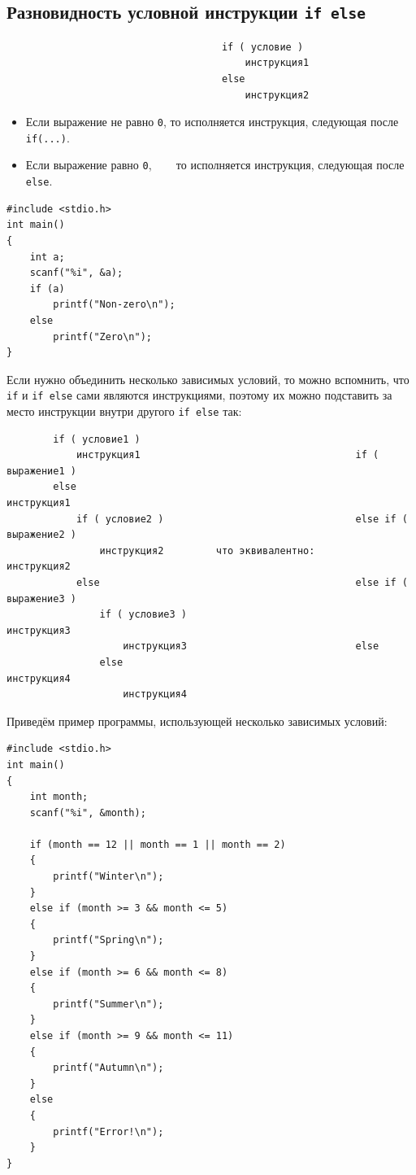 \documentclass[10pt]{article}
\begin{document}
\subsection*{Разновидность условной инструкции \texttt{if else}}
\begin{lstlisting}
                                     if ( условие )
                                         инструкция1
                                     else 
                                         инструкция2
\end{lstlisting}
\begin{itemize}
\item Если выражение не равно \texttt{0}, то исполняется инструкция, следующая после \texttt{if(...)}.
\item Если выражение равно \texttt{0}, ~~~ то исполняется инструкция, следующая после \texttt{else}.
\end{itemize}
\begin{lstlisting}
#include <stdio.h>
int main()
{
    int a;
    scanf("%i", &a);
    if (a)
        printf("Non-zero\n");
    else
        printf("Zero\n");
}
\end{lstlisting}
Если нужно объединить несколько зависимых условий, то можно вспомнить, что \texttt{if} и \texttt{if else} сами являются инструкциями, поэтому их можно подставить за место инструкции внутри другого \texttt{if else} так:
\begin{lstlisting}
        if ( условие1 )                                                                             
            инструкция1                                     if ( выражение1 )
        else                                                    инструкция1
            if ( условие2 )                                 else if ( выражение2 )
                инструкция2         что эквивалентно:           инструкция2
            else                                            else if ( выражение3 )            
                if ( условие3 )                                 инструкция3
                    инструкция3                             else
                else                                            инструкция4
                    инструкция4                                                                                                                        
\end{lstlisting}

Приведём пример программы, использующей несколько зависимых условий:
\begin{lstlisting}
#include <stdio.h>
int main() 
{
    int month;
    scanf("%i", &month);
    
    if (month == 12 || month == 1 || month == 2)
    {
        printf("Winter\n");
    }
    else if (month >= 3 && month <= 5) 
    {
        printf("Spring\n");
    }
    else if (month >= 6 && month <= 8) 
    {
        printf("Summer\n");
    }
    else if (month >= 9 && month <= 11) 
    {
        printf("Autumn\n");
    }
    else 
    {
        printf("Error!\n");
    }
}
\end{lstlisting}
\end{document}
